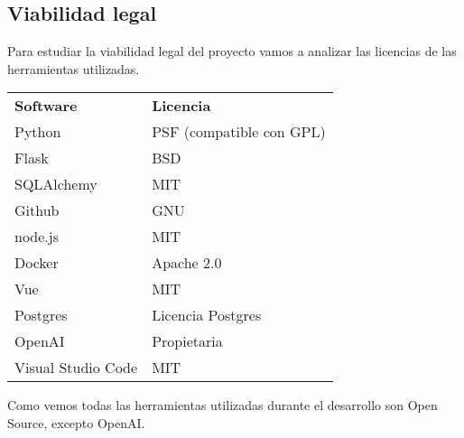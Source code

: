\subsection{Viabilidad legal}

Para estudiar la viabilidad legal del proyecto vamos a analizar las licencias de las
herramientas utilizadas.

\begin{tabular}{l l}
    \textbf{Software} & \textbf{Licencia}\\
    Python & PSF (compatible con GPL) \\
    Flask & BSD\\
    SQLAlchemy & MIT\\
    Github & GNU\\
    node.js & MIT\\
    Docker & Apache 2.0\\
    Vue & MIT\\
    Postgres & Licencia Postgres\\
    OpenAI & Propietaria\\
    Visual Studio Code & MIT \\
\end{tabular}

Como vemos todas las herramientas utilizadas durante el desarrollo son Open Source, 
excepto OpenAI.